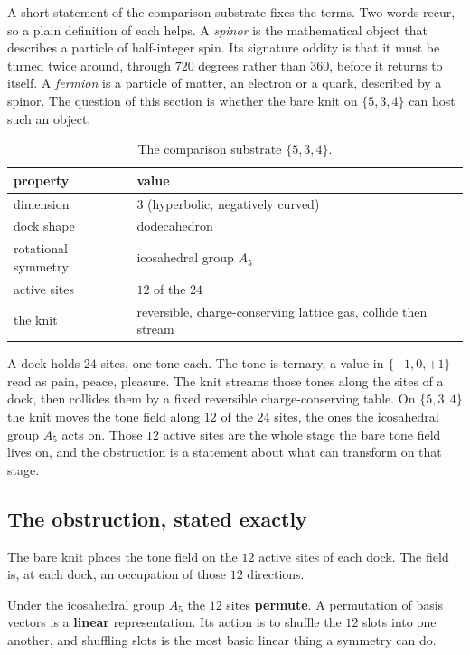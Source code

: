 A short statement of the comparison substrate fixes the terms. Two words recur, so a plain definition of each
helps. A \emph{spinor} is the mathematical object that describes a particle of half-integer spin. Its signature
oddity is that it must be turned twice around, through $720$ degrees rather than $360$, before it returns to
itself. A \emph{fermion} is a particle of matter, an electron or a quark, described by a spinor. The question of
this section is whether the bare knit on $\{5,3,4\}$ can host such an object.

\begin{table}[ht]
\centering
\begin{tabular}{@{}ll@{}}
\toprule
property & value \\
\midrule
dimension & $3$ (hyperbolic, negatively curved) \\
dock shape & dodecahedron \\
rotational symmetry & icosahedral group $A_5$ \\
active sites & $12$ of the $24$ \\
the knit & reversible, charge-conserving lattice gas, collide then stream \\
\bottomrule
\end{tabular}
\caption{The comparison substrate $\{5,3,4\}$.}
\label{tab:534-substrate}
\end{table}

A dock holds $24$ sites, one tone each. The tone is ternary, a value in $\{-1, 0, +1\}$ read as pain, peace,
pleasure. The knit streams those tones along the sites of a dock, then collides them by a fixed reversible
charge-conserving table. On $\{5,3,4\}$ the knit moves the tone field along $12$ of the $24$ sites, the ones the
icosahedral group $A_5$ acts on. Those $12$ active sites are the whole stage the bare tone field lives on, and
the obstruction is a statement about what can transform on that stage.

\subsection{The obstruction, stated exactly}

The bare knit places the tone field on the $12$ active sites of each dock. The field is, at each dock, an
occupation of those $12$ directions.

Under the icosahedral group $A_5$ the $12$ sites \textbf{permute}. A permutation of basis vectors is a
\textbf{linear} representation. Its action is to shuffle the $12$ slots into one another, and shuffling slots is
the most basic linear thing a symmetry can do.

